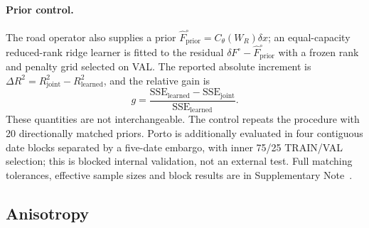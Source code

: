 \documentclass[11pt]{article}
\begin{document}
\paragraph{Prior control.} The road operator also supplies a prior $\widehat F^\circ_{\mathrm{prior}}=C_\theta(W_R)\delta x$; an equal-capacity reduced-rank ridge learner is fitted to the residual $\delta F^\circ-\widehat F^\circ_{\mathrm{prior}}$ with a frozen rank and penalty grid selected on VAL. The reported absolute increment is $\Delta R^2=R^2_{\mathrm{joint}}-R^2_{\mathrm{learned}}$, and the relative gain is
\begin{equation}\label{eq:m-priorgain}
 g=\frac{\mathrm{SSE}_{\mathrm{learned}}-\mathrm{SSE}_{\mathrm{joint}}}
 {\mathrm{SSE}_{\mathrm{learned}}}.
\end{equation}
These quantities are not interchangeable. The control repeats the procedure with 20 directionally matched priors. Porto is additionally evaluated in four contiguous date blocks separated by a five-date embargo, with inner 75/25 TRAIN/VAL selection; this is blocked internal validation, not an external test. Full matching tolerances, effective sample sizes and block results are in Supplementary Note~.

\subsection{Anisotropy}
\end{document}
